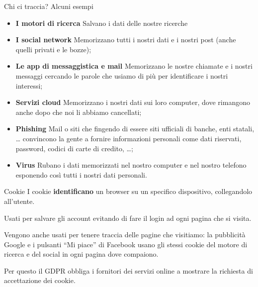 \begin{myframe}{Chi ci traccia?}
  Alcuni esempi \pause
  \begin{itemize}[<+->]
    \item \textbf{I motori di ricerca} Salvano i dati delle nostre ricerche
    \item \textbf{I social network} Memorizzano tutti i nostri dati e i nostri post (anche quelli privati e le bozze);
    \item \textbf{Le app di messaggistica e mail} Memorizzano le nostre chiamate e i nostri messaggi cercando le parole che usiamo di più per identificare i nostri interessi;
    \item \textbf{Servizi cloud} Memorizzano i nostri dati sui loro computer, dove rimangono anche dopo che noi li abbiamo cancellati;
    \item \textbf{Phishing} Mail o siti che fingendo di essere siti ufficiali di banche, enti statali, \dots{} convincono la gente a fornire informazioni personali come dati riservati, password, codici di carte di credito, \dots;
    \item \textbf{Virus} Rubano i dati memorizzati nel nostro computer e nel nostro telefono esponendo così tutti i nostri dati personali.
  \end{itemize}
\end{myframe}

\begin{myframe}{Cookie}
  I cookie \textbf{identificano} un browser su un specifico dispositivo, collegandolo all'utente.

  Usati per salvare gli account evitando di fare il login ad ogni pagina che si visita.

  \pause\medskip
  Vengono anche usati per tenere traccia delle pagine che visitiamo: la pubblicità Google e i pulsanti ``Mi piace'' di Facebook usano gli stessi cookie del motore di ricerca e del social in ogni pagina dove compaiono.

  Per questo il GDPR obbliga i fornitori dei servizi online a mostrare la richiesta di accettazione dei cookie.
\end{myframe}
